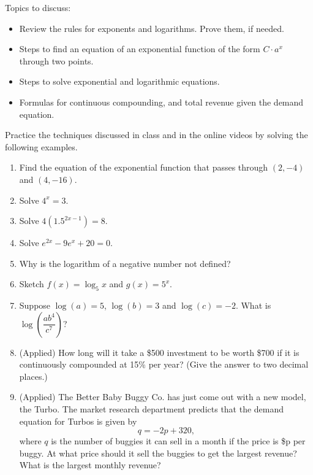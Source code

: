 \documentclass[10pt]{book}
\theoremstyle{definition}
\theoremstyle{remark}
\begin{document}
\begin{large}
\noindent
Topics to discuss:
\begin{itemize}
\item Review the rules for exponents and logarithms. Prove them, if needed. 
\item Steps to find an equation of an exponential function of the form $C \cdot a^{x}$ through two points. 
\item Steps to solve exponential and logarithmic equations. 
\item Formulas for continuous compounding, and total revenue given the demand equation.
\end{itemize}
\newpage

\noindent
Practice the techniques discussed in class and in the online videos by solving the following examples. 
\begin{enumerate}
\item Find the equation of the exponential function that passes through $(2,-4)$ and $(4,-16)$.\vfil\vfil
\item Solve $4^x = 3$.\vfil
\newpage

\item Solve $4(1.5^{2x-1}) = 8$.\vfil\vfil
\item Solve $e^{2x} - 9e^x + 20 = 0$.\vfil
\newpage

\item Why is the logarithm of a negative number not defined?\vfil
\item Sketch $f(x) = \log_5 x$ and $g(x) = 5^x$.\vfil\vfil
\item Suppose $\log(a) = 5$, $\log(b) = 3$ and $\log(c) = -2$.  What is $\log\left(\dfrac{ab^4}{c^7} \right)$?\vfil
\newpage

\item (Applied) How long will it take a \$500 investment to be worth \$700 if it is continuously compounded at 15\% per year? (Give the answer to two decimal places.)\vfil\vfil
\item (Applied) The Better Baby Buggy Co. has just come out with a new model, the Turbo. The market research department  predicts that the demand equation for Turbos is given by \[q = -2p + 320,\] where $q$ is the number of buggies it can sell in a month if the price is \$p per buggy. At what price should it sell the buggies to get the largest revenue? What is the largest monthly revenue?\vfil
\end{enumerate}
\end{large}
\newpage
\end{document}
